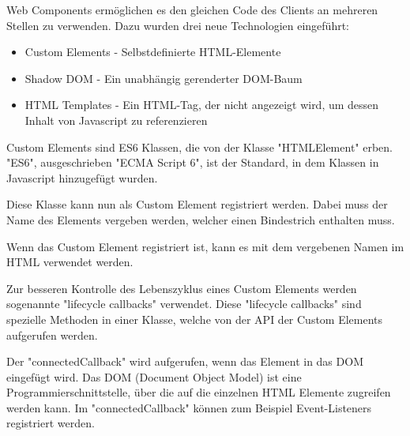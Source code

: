 
Web Components ermöglichen es den gleichen Code des Clients an mehreren Stellen zu verwenden. Dazu wurden drei neue Technologien \cite{MDNWebComponents} eingeführt:

\begin{itemize}
    \item Custom Elements - Selbstdefinierte HTML-Elemente
    \item Shadow DOM - Ein unabhängig gerenderter DOM-Baum
    \item HTML Templates - Ein HTML-Tag, der nicht angezeigt wird, um dessen Inhalt von Javascript zu referenzieren
\end{itemize}




Custom Elements sind ES6 Klassen, die von der Klasse "HTMLElement" erben. "ES6", ausgeschrieben "ECMA Script 6", ist der Standard, in dem Klassen in Javascript hinzugefügt wurden.\cite{MDNes6Classes}


Diese Klasse kann nun als Custom Element registriert werden. Dabei muss der Name des Elements vergeben werden, welcher einen Bindestrich enthalten muss.


Wenn das Custom Element registriert ist, kann es mit dem vergebenen Namen im HTML verwendet werden.


Zur besseren Kontrolle des Lebenszyklus eines Custom Elements werden sogenannte "lifecycle callbacks" verwendet.
Diese "lifecycle callbacks" sind spezielle Methoden in einer Klasse, welche von der API der Custom Elements aufgerufen werden. \cite{MDNWebCustomElements}

Der "{\ttfamily connectedCallback}" wird aufgerufen, wenn das Element in das DOM eingefügt wird. Das DOM (Document Object Model) ist eine Programmierschnittstelle, über die auf die einzelnen HTML Elemente zugreifen werden kann. \cite{MDNDOM} Im "{\ttfamily connectedCallback}" können zum Beispiel Event-Listeners registriert werden. \cite{MDNWebCustomElements}

